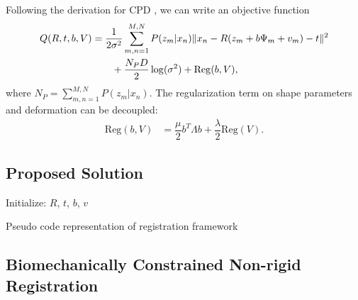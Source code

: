 \documentclass[10pt]{article}
\begin{document}
Following the derivation for CPD \cite{myronenko:2010:cpd}, we can write an objective function
\begin{align}
 Q(R,t,b,V) & = \dfrac{1}{2\sigma^2}\sum_{m,n=1}^{M,N} P(z_m|x_n)\|x_n-R(z_m+b\Psi_m+v_m)- t\|^2 \notag\\ 
  & \qquad + \dfrac{N_PD}{2}\log(\sigma^2) + \mathrm{Reg}(b,V),
\end{align}
where $N_P=\sum_{m,n=1}^{M,N}P(z_m|x_n)$.  The regularization term on shape parameters and deformation can be decoupled:
\begin{align}
  \mathrm{Reg}(b,V) & = \dfrac{\mu}{2}b^T\Lambda b + \dfrac{\lambda}{2}\mathrm{Reg}(V).
\end{align}

\subsection{Proposed Solution}

\begin{algorithm}[H]
 \SetAlgoLined
 Initialize: $R$, $t$, $b$, $v$\;
 \caption{Pseudo code representation of registration framework \label{alg:registration}}
\end{algorithm}

\subsection{Biomechanically Constrained Non-rigid Registration}
\end{document}
